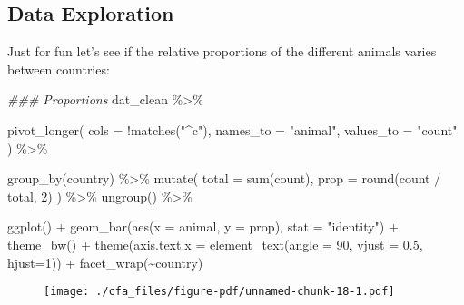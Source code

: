 \documentclass[
  letterpaper,
  DIV=11,
  numbers=noendperiod]{scrreprt}
\newenvironment{Shaded}{\begin{snugshade}}{\end{snugshade}}
\newcommand{\AttributeTok}[1]{\textcolor[rgb]{0.40,0.45,0.13}{#1}}
\newcommand{\DecValTok}[1]{\textcolor[rgb]{0.68,0.00,0.00}{#1}}
\newcommand{\DocumentationTok}[1]{\textcolor[rgb]{0.37,0.37,0.37}{\textit{#1}}}
\newcommand{\FloatTok}[1]{\textcolor[rgb]{0.68,0.00,0.00}{#1}}
\newcommand{\FunctionTok}[1]{\textcolor[rgb]{0.28,0.35,0.67}{#1}}
\newcommand{\NormalTok}[1]{\textcolor[rgb]{0.00,0.23,0.31}{#1}}
\newcommand{\SpecialCharTok}[1]{\textcolor[rgb]{0.37,0.37,0.37}{#1}}
\newcommand{\StringTok}[1]{\textcolor[rgb]{0.13,0.47,0.30}{#1}}
\begin{document}
\hypertarget{data-exploration-1}{%
\subsection{Data Exploration}\label{data-exploration-1}}

Just for fun let's see if the relative proportions of the different
animals varies between countries:

\begin{Shaded}
\begin{Highlighting}[]
\DocumentationTok{\#\#\# Proportions}
\NormalTok{dat\_clean }\SpecialCharTok{\%\textgreater{}\%} 
  
  \FunctionTok{pivot\_longer}\NormalTok{(}
    \AttributeTok{cols      =} \SpecialCharTok{!}\FunctionTok{matches}\NormalTok{(}\StringTok{"\^{}c"}\NormalTok{),}
    \AttributeTok{names\_to  =} \StringTok{"animal"}\NormalTok{,}
    \AttributeTok{values\_to =} \StringTok{"count"}
\NormalTok{  ) }\SpecialCharTok{\%\textgreater{}\%} 
  
  \FunctionTok{group\_by}\NormalTok{(country) }\SpecialCharTok{\%\textgreater{}\%} 
  \FunctionTok{mutate}\NormalTok{(}
    \AttributeTok{total =} \FunctionTok{sum}\NormalTok{(count), }
    \AttributeTok{prop  =} \FunctionTok{round}\NormalTok{(count }\SpecialCharTok{/}\NormalTok{ total, }\DecValTok{2}\NormalTok{)}
\NormalTok{  ) }\SpecialCharTok{\%\textgreater{}\%} 
  \FunctionTok{ungroup}\NormalTok{() }\SpecialCharTok{\%\textgreater{}\%} 

  \FunctionTok{ggplot}\NormalTok{() }\SpecialCharTok{+} 
  \FunctionTok{geom\_bar}\NormalTok{(}\FunctionTok{aes}\NormalTok{(}\AttributeTok{x =}\NormalTok{ animal, }\AttributeTok{y =}\NormalTok{ prop), }\AttributeTok{stat =} \StringTok{"identity"}\NormalTok{) }\SpecialCharTok{+} 
  \FunctionTok{theme\_bw}\NormalTok{() }\SpecialCharTok{+} 
  \FunctionTok{theme}\NormalTok{(}\AttributeTok{axis.text.x =} \FunctionTok{element\_text}\NormalTok{(}\AttributeTok{angle =} \DecValTok{90}\NormalTok{, }\AttributeTok{vjust =} \FloatTok{0.5}\NormalTok{, }\AttributeTok{hjust=}\DecValTok{1}\NormalTok{)) }\SpecialCharTok{+}
  \FunctionTok{facet\_wrap}\NormalTok{(}\SpecialCharTok{\textasciitilde{}}\NormalTok{country)}
\end{Highlighting}
\end{Shaded}

\begin{figure}[H]

{\centering \texttt{[image: ./cfa\_files/figure-pdf/unnamed-chunk-18-1.pdf]}

}

\end{figure}
\end{document}
